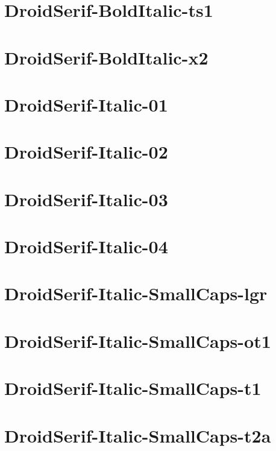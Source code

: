 \documentclass{article}
\begin{document}
\section{DroidSerif-BoldItalic-ts1}

\section{DroidSerif-BoldItalic-x2}

\section{DroidSerif-Italic-01}

\section{DroidSerif-Italic-02}

\section{DroidSerif-Italic-03}

\section{DroidSerif-Italic-04}

\section{DroidSerif-Italic-SmallCaps-lgr}

\section{DroidSerif-Italic-SmallCaps-ot1}

\section{DroidSerif-Italic-SmallCaps-t1}

\section{DroidSerif-Italic-SmallCaps-t2a}
\end{document}
